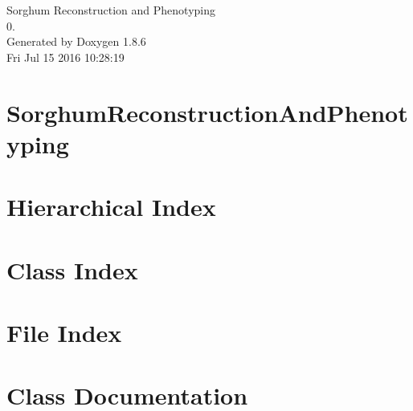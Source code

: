 \documentclass[twoside]{book}
\newcommand{\clearemptydoublepage}{%
  \newpage{\pagestyle{empty}\cleardoublepage}%
}
\begin{document}
\hypersetup{pageanchor=false}
\begin{titlepage}
\vspace*{7cm}
\begin{center}%
{\Large Sorghum Reconstruction and Phenotyping \\[1ex]\large 0. }\\
\vspace*{1cm}
{\large Generated by Doxygen 1.8.6}\\
\vspace*{0.5cm}
{\small Fri Jul 15 2016 10:28:19}\\
\end{center}
\end{titlepage}
\clearemptydoublepage
\tableofcontents
\clearemptydoublepage
{}
\hypersetup{pageanchor=true}

\chapter{Sorghum\-Reconstruction\-And\-Phenotyping}
\label{md_README}
\hypertarget{md_README}{}

\chapter{Hierarchical Index}

\chapter{Class Index}

\chapter{File Index}

\chapter{Class Documentation}



































\end{document}
